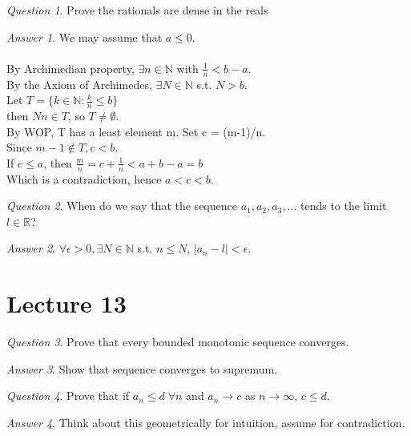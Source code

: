 \documentclass[]{article}
\def\naturals{\mathbb{N}}
\def\reals{\mathbb{R}}
\theoremstyle{remark}
\theoremstyle{qnstyle}
\newtheorem{question}{Question}
\theoremstyle{answerstyle}
\newtheorem*{answer}{Answer}
\begin{document}
\begin{question}
    Prove the rationals are dense in the reals
\end{question}
\begin{answer}
    We may assume that $a \leq 0$. \\ \\
    By Archimedian property, $\exists n \in \naturals$ with $\frac{1}{n} < b-a$.\\
    By the Axiom of Archimedes, $\exists N \in \naturals$ s.t. $N > b$.\\
    Let $T = \{k \in \naturals: \frac{k}{n} \leq b\}$\\
    then $Nn \in T$, so $T \neq \emptyset$.\\
    By WOP, T has a least element m. Set c = (m-1)/n.\\
    Since $m-1 \not \in T, c < b$.\\
    If $c \leq a$, then $\frac{m}{n} = c + \frac{1}{n} < a+b-a = b$ \\
    Which is a contradiction, hence $a < c < b$.
\end{answer}

\begin{question}
    When do we say that the sequence $a_1, a_2, a_3, \ldots$ tends to
    the limit $l \in \reals$?
\end{question}
\begin{answer}
    $\forall \epsilon > 0, \exists N \in \naturals$ s.t. $n \leq N$,
    $|a_n - l| < \epsilon$.
\end{answer}





\section* {Lecture 13}

\begin{question}
    Prove that every bounded monotonic sequence converges.
\end{question}
\begin{answer}
    Show that sequence converges to supremum.
\end{answer}

\begin{question}
    Prove that if $a_n \leq d \; \forall n$ and $a_n \to c$ as $n \to \infty$,
    $c \leq d$.
\end{question}
\begin{answer}
    Think about this geometrically for intuition, assume for contradiction.
\end{answer}
\end{document}
